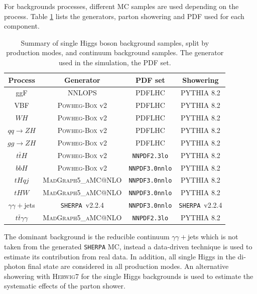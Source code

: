 For backgrounds processes, different MC samples are used depending on the process. Table \ref{tab:HHyybb:Data&MC:Samples} lists the generators, parton showering and PDF used for each component. 
\begin{table}[ht]
  \centering
    \begin{tabular}{ cccc }
    \hline\hline
    Process & Generator & PDF set  & Showering    \\
       \hline\hline
        ggF  & NNLOPS & PDFLHC &  \textsc{PYTHIA} 8.2  \\
        VBF & \textsc{Powheg-Box} v2 & PDFLHC  &  \textsc{PYTHIA} 8.2        \\
        $WH$ & \textsc{Powheg-Box} v2 & PDFLHC  &  \textsc{PYTHIA} 8.2 \\
        $qq\to ZH$ & \textsc{Powheg-Box} v2 &  PDFLHC  &  \textsc{PYTHIA} 8.2 \\
        $gg\to ZH$ &  \textsc{Powheg-Box} v2 & PDFLHC  &  \textsc{PYTHIA} 8.2  \\
        $t\bar{t}H$ & \textsc{Powheg-Box} v2 & \texttt{NNPDF2.3lo} & \textsc{PYTHIA} 8.2  \\
        $bbH$ &  \textsc{Powheg-Box} v2 & \texttt{NNPDF3.0nnlo}  &  \textsc{PYTHIA} 8.2     \\
        $tHqj$ & \textsc{MadGraph5\_aMC@NLO} &  \texttt{NNPDF3.0nnlo}  & \textsc{PYTHIA} 8.2   \\
        $tHW$  & \textsc{MadGraph5\_aMC@NLO} &  \texttt{NNPDF3.0nnlo}  & \textsc{PYTHIA} 8.2   \\
         $\gamma\gamma+$jets &   \texttt{SHERPA}~v2.2.4 & \texttt{NNPDF3.0nnlo}  &  \texttt{SHERPA}~v2.2.4  \\
         $t\bar{t} \gamma \gamma$ & \textsc{MadGraph5\_aMC@NLO}  &  \texttt{NNPDF2.3lo} & \textsc{PYTHIA} 8.2 \\
        \hline\hline
    \end{tabular}
    \caption{Summary of single Higgs boson background samples, split by production modes, and continuum background samples. The generator used in the simulation, the PDF set. }
  \label{tab:HHyybb:Data&MC:Samples}
\end{table}

The dominant background is the reducible continuum $\gamma\gamma+$jets which is not taken from the generated \texttt{SHERPA} MC, instead a data-driven technique is used to estimate its contribution from real data. In addition, all single Higgs in the di-photon final state are considered in all production modes.  An alternative showering with \textsc{Herwig}7 for the single Higgs backgrounds is used to estimate the systematic effects of the parton shower.

